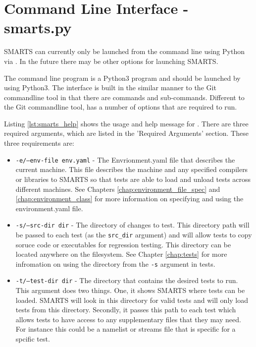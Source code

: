 \chapter{Command Line Interface - smarts.py}
\label{chap:smarts_commandline}

SMARTS can currently only be launched from the command line using Python via
\smartspy. In the future there may be other options for launching SMARTS.

The \smartspy command line program is a Python3 program and should be launched
by using Python3. The \smartspy interface is built in the similar manner to the
Git commandline tool in that there are commands and sub-commands. Different to
the Git commandline tool, \smartspy has a number of options that are required
to run.

Listing \ref{lst:smarts_help} shows the usage and help message for \smartspy.
There are three required arguments, which are listed in the 'Required
Arguments' section. These three requirements are:

\begin{itemize}
    \item {\tt -e/--env-file env.yaml} - The Envrionment.yaml file that
    describes the current machine. This file describes the machine and any
    specified compilers or libraries to SMARTS so that tests are able to load
    and unload tests across different machines. See Chapters
    \ref{chap:environment_file_spec} and \ref{chap:environment_class} for more
    information on specifying and using the environment.yaml file.

    \item {\tt -s/--src-dir dir} - The directory of changes to test. This
    directory path will be passed to each test (as the {\tt src\_dir} argument)
    and will allow tests to copy soruce code or executables for regression
    testing. This directory can be located anywhere on the filesystem. See
    Chapter \ref{chap:tests} for more infromation on using the directory from
    the {\tt -s} argument in tests.

    \item {\tt -t/--test-dir dir} - The directory that contains the desired
    tests to run. This argument does two things. One, it shows SMARTS where
    tests can be loaded. SMARTS will look in this directory for valid tests and
    will only load tests from this directory. Secondly, it passes this path to
    each test which allows tests to have access to any supplementary files that
    they may need. For instance this could be a namelist or streams file that
    is specific for a spcific test.
\end{itemize}

